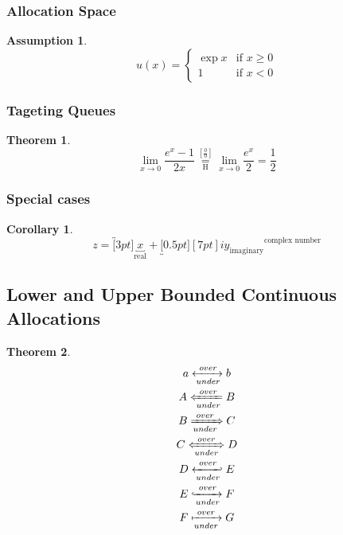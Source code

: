 \documentclass[12pt,english]{article}
\newtheorem{theorem}{Theorem}[section]
\newtheorem{corollary}{Corollary}[theorem]
\newtheorem{assumption}{Assumption}[section]
\begin{document}
\subsubsection{Allocation Space}

\blindtext

\begin{assumption}
\label{as:2a}
\[
 u(x) =
  \begin{cases}
   \exp{x} & \text{if } x \geq 0 \\
   1       & \text{if } x < 0
  \end{cases}
\]
\end{assumption}

\subsubsection{Tageting Queues}

\begin{theorem}
\label{thm:2a}
\blindenumerate
\[
\lim_{x\to 0}{\frac{e^x-1}{2x}}
\overset{\left[\frac{0}{0}\right]}{\underset{\mathrm{H}}{=}}
\lim_{x\to 0}{\frac{e^x}{2}}={\frac{1}{2}}
\]
\blindtext
\end{theorem}

\subsubsection{Special cases}

\begin{corollary}
\label{corr:2a}
\[
z = \overbracket[3pt]{
		\underbracket{x}_{\text{real}} +
		\underbracket[0.5pt][7pt]{iy}_{\text{imaginary}}
		}^{\text{complex number}}
\]
\blinditemize
\end{corollary}

\subsection{Lower and Upper Bounded Continuous Allocations}
\begin{theorem}
\label{thm:2b}
\begin{gather}
 a \xleftrightarrow[under]{over} b\\
%
 A \xLeftarrow[under]{over} B\\
%
 B \xRightarrow[under]{over} C\\
%
 C \xLeftrightarrow[under]{over} D\\
%
 D \xhookleftarrow[under]{over} E\\
%
 E \xhookrightarrow[under]{over} F\\
%
 F \xmapsto[under]{over} G\\
\end{gather}
\end{theorem}
\end{document}
